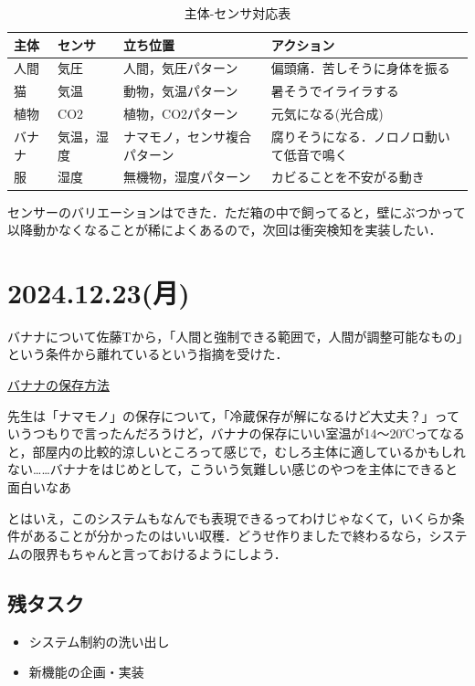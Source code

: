 \documentclass[fleqn,twocolumn]{mynote}
\begin{document}
  \begin{table}[h]
    \caption{主体-センサ対応表}
    \label{tab:}
    \centering
    \begin{tabular}{|l|l|l|l|}
      \hline
      主体 & センサ & 立ち位置 & アクション \\
      \hline
      人間 & 気圧  & 人間，気圧パターン & 偏頭痛．苦しそうに身体を振る\\
      猫 & 気温  & 動物，気温パターン & 暑そうでイライラする\\
      植物 & CO2  & 植物，CO2パターン & 元気になる(光合成)\\
      バナナ & 気温，湿度  & ナマモノ，センサ複合パターン & 腐りそうになる．ノロノロ動いて低音で鳴く\\
      服 & 湿度  & 無機物，湿度パターン & カビることを不安がる動き\\
      \hline
    \end{tabular}
  \end{table}

  センサーのバリエーションはできた．ただ箱の中で飼ってると，壁にぶつかって以降動かなくなることが稀によくあるので，次回は衝突検知を実装したい．

  \section*{2024.12.23(月)}
  バナナについて佐藤Tから，「人間と強制できる範囲で，人間が調整可能なもの」という条件から離れているという指摘を受けた．

  \href{https://www.dole.co.jp/lp/jp/magazine/banana/preservation/#a03}{バナナの保存方法}

  先生は「ナマモノ」の保存について，「冷蔵保存が解になるけど大丈夫？」っていうつもりで言ったんだろうけど，バナナの保存にいい室温が14～20℃ってなると，部屋内の比較的涼しいところって感じで，むしろ主体に適しているかもしれない……バナナをはじめとして，こういう気難しい感じのやつを主体にできると面白いなあ

  とはいえ，このシステムもなんでも表現できるってわけじゃなくて，いくらか条件があることが分かったのはいい収穫．どうせ作りましたで終わるなら，システムの限界もちゃんと言っておけるようにしよう．

  \subsection*{残タスク}
  \begin{itemize}
    \item システム制約の洗い出し
    \item 新機能の企画・実装
  \end{itemize}
\end{document}
